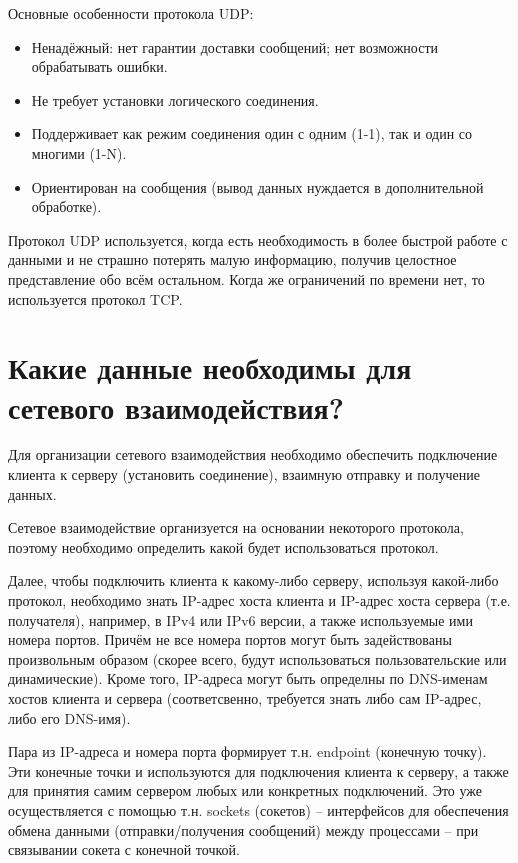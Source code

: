 \documentclass[a4paper,12pt]{article}	%
\begin{document}
	Основные особенности протокола UDP:
	
	\begin{itemize}
	
		\item Ненадёжный: нет гарантии доставки сообщений; нет возможности обрабатывать ошибки.
		
		\item Не требует установки логического соединения.
		
		\item Поддерживает как режим соединения один с одним (1-1), так и один со многими (1-N).
		
		\item Ориентирован на сообщения (вывод данных нуждается в дополнительной обработке).
	
	\end{itemize}
	
	Протокол UDP используется, когда есть необходимость в более быстрой работе с данными и не страшно потерять малую информацию, получив целостное представление обо всём остальном. Когда же ограничений по времени нет, то используется протокол TCP.	
	
	
\section{Какие данные необходимы для сетевого взаимодействия?}

	Для организации сетевого взаимодействия необходимо обеспечить подключение клиента к серверу (установить соединение), взаимную отправку и получение данных.
	
	Сетевое взаимодействие организуется на основании некоторого протокола, поэтому необходимо определить какой будет использоваться протокол.	
	
	Далее, чтобы подключить клиента к какому-либо серверу, используя какой-либо протокол, необходимо знать IP-адрес хоста клиента и IP-адрес хоста сервера (т.е. получателя), например, в IPv4 или IPv6 версии, а также используемые ими номера портов. Причём не все номера портов могут быть задействованы произвольным образом (скорее всего, будут использоваться пользовательские или динамические). Кроме того, IP-адреса могут быть определны по DNS-именам хостов клиента и сервера (соответсвенно, требуется знать либо сам IP-адрес, либо его DNS-имя).
	
	Пара из IP-адреса и номера порта формирует т.н. endpoint (конечную точку). Эти конечные точки и используются для подключения клиента к серверу, а также для принятия самим сервером любых или конкретных подключений. Это уже осуществляется с помощью т.н. sockets (сокетов) -- интерфейсов для обеспечения обмена данными (отправки/получения сообщений) между процессами -- при связывании сокета с конечной точкой.
	
\end{document}
